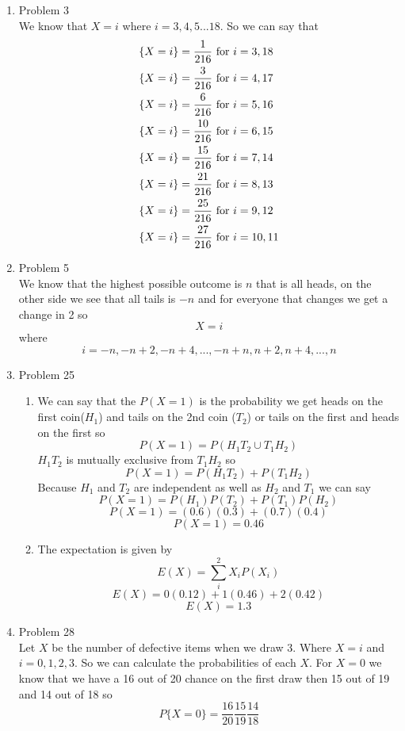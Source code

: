 \documentclass[11pt]{article}
\begin{document}
\begin{enumerate}
\item Problem 3\\
We know that $X=i$ where $i=3,4,5...18$. So we can say that
\begin{align*}
&\{X=i\} = \frac{1}{216} \textnormal{ for } i=3,18\\
&\{X=i\} = \frac{3}{216} \textnormal{ for } i=4,17\\
&\{X=i\} = \frac{6}{216} \textnormal{ for } i=5,16\\
&\{X=i\} = \frac{10}{216} \textnormal{ for } i=6,15\\
&\{X=i\} = \frac{15}{216} \textnormal{ for } i=7,14\\
&\{X=i\} = \frac{21}{216} \textnormal{ for } i=8,13\\
&\{X=i\} = \frac{25}{216} \textnormal{ for } i=9,12\\
&\{X=i\} = \frac{27}{216} \textnormal{ for } i=10,11\\
\end{align*}
\item Problem 5\\
We know that the highest possible outcome is $n$ that is all heads, on the other side we see that all tails is $-n$ and for everyone that changes we get a change in 2 so
$$X=i$$
where
$$i = -n, -n+2, -n+4,...,-n+n,n+2,n+4,...,n$$
\item Problem 25\\
\begin{enumerate}
\item
We can say that the $P(X=1)$ is the probability we get heads on the first coin($H_1$) and tails on the 2nd coin ($T_2$) or tails on the first and heads on the first so
$$P(X=1) = P(H_1T_2\cup T_1H_2)$$
$H_1T_2$ is mutually exclusive from $T_1H_2$ so
$$P(X=1) = P(H_1T_2)+ P(T_1H_2)$$
Because $H_1$ and $T_2$ are independent as well as $H_2$ and $T_1$ we can say
$$P(X=1) = P(H_1)P(T_2)+ P(T_1)P(H_2)$$
$$P(X=1) = (0.6)(0.3)+(0.7)(0.4)$$
$$P(X=1) = 0.46$$
\item
The expectation is given by 
$$E(X) = \sum_{i}^{2}X_iP(X_i)$$
$$E(X) = 0(0.12)+1(0.46)+2(0.42)$$
$$E(X) = 1.3$$
\end{enumerate}
\item Problem 28\\
Let $X$ be the number of defective items when we draw 3. Where $X=i$ and $i=0,1,2,3$. So we can calculate the probabilities of each $X$. For $X=0$ we know that we have a 16 out of 20 chance on the first draw then 15 out of 19 and 14 out of 18 so
$$P\{X=0\} = \frac{16}{20}\frac{15}{19}\frac{14}{18}$$

\end{enumerate}
\end{document}
